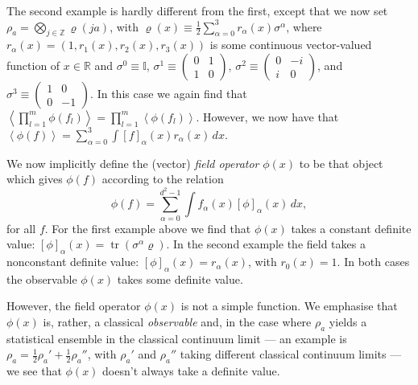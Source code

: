 \documentclass[prl,twocolumn,lengthcheck,superscriptaddress]{revtex4-1}
\newcommand{\tr}{\operatorname{tr}}
\theoremstyle{definition}
\theoremstyle{remark}
\begin{document}
The second example is hardly different from the first, except that we now set $\rho_a = \bigotimes_{j\in\mathbb{Z}} \varrho(ja)$, with $\varrho(x) \equiv \frac{1}{2}\sum_{\alpha=0}^3r_{\alpha}(x)\sigma^\alpha$, where $r_\alpha(x) = (1, r_1(x), r_2(x), r_3(x))$  is some continuous vector-valued function of $x\in \mathbb{R}$ and $\sigma^0 \equiv \mathbb{I}$, $\sigma^1 \equiv \left(\begin{smallmatrix}0 & 1\\ 1 & 0\end{smallmatrix}\right)$, $\sigma^2 \equiv  \left(\begin{smallmatrix}0 & -i\\ i & 0\end{smallmatrix}\right)$, and  $\sigma^3 \equiv \left(\begin{smallmatrix}1 & 0\\0 & -1\end{smallmatrix}\right)$. In this case we again find that $\left\langle\prod_{l=1}^m\phi(f_l)\right\rangle = \prod_{l=1}^m\left\langle\phi(f_l)\right\rangle$. However, we now have that $\left\langle\phi(f)\right\rangle =  \sum_{\alpha=0}^3\int [f]_\alpha(x) r_\alpha(x) \, dx$.

We now implicitly define the (vector) \emph{field operator} $\phi(x)$ to be that object which gives $\phi(f)$ according to the relation 
\begin{equation}
	\phi(f) = \sum_{\alpha=0}^{d^2-1}\int f_\alpha(x) [\phi]_\alpha(x)\,dx, 
\end{equation}
for all $f$. For the first example above we find that  $\phi(x)$ takes a constant definite value: $[\phi]_\alpha(x) = \tr(\sigma^\alpha \varrho)$. In the second example the field takes a nonconstant definite value: $[\phi]_\alpha(x) = r_\alpha(x)$, with $r_0(x) = 1$.  In both cases the observable $\phi(x)$ takes some definite value.

However, the field operator $\phi(x)$ is not a simple function. We emphasise that $\phi(x)$ is, rather, a classical \emph{observable} and, in the case where $\rho_a$  yields a statistical ensemble in the classical continuum limit --- an example is $\rho_a = \frac12 \rho_a' + \frac12 \rho_a''$, with $\rho_a'$ and $\rho_a''$ taking different classical continuum limits --- we see that $\phi(x)$ doesn't always take a definite value. 
\end{document}
